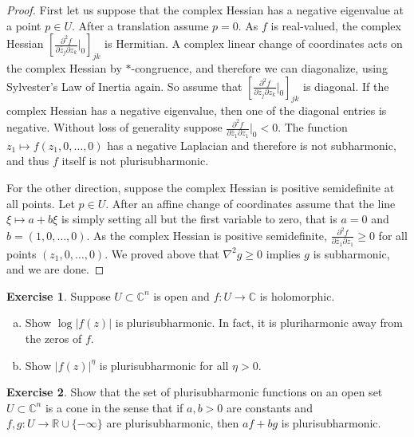 \documentclass[12pt,openany]{book}
\newcommand{\sabs}[1]{\lvert {#1} \rvert}
\newcommand{\C}{{\mathbb{C}}}
\newcommand{\R}{{\mathbb{R}}}
\theoremstyle{plain}
\theoremstyle{remark}
\theoremstyle{definition}
\newenvironment{exbox}{%
    \def\FrameCommand{\vrule width 1pt \relax\hspace {10pt}}%
    \MakeFramed {\advance \hsize -\width \FrameRestore }%
}{%
    \endMakeFramed
}
\newenvironment{exparts}{%
    \leavevmode\begin{enumerate}[a),noitemsep,topsep=0pt,parsep=0pt,partopsep=0pt]
}{%
    \end{enumerate}
}
\theoremstyle{exercise}
\newtheorem{exercise}{Exercise}[section]
\theoremstyle{example}
\begin{document}
\begin{proof}
First let us suppose that the complex Hessian has a negative eigenvalue at
a point $p \in U$.
After a translation assume $p=0$.
As $f$ is real-valued, the complex Hessian
$\left[
\frac{\partial^2 f}{\partial \bar{z}_j \partial z_k}
\Big|_0
\right]_{jk}$ is Hermitian.  A complex linear change of coordinates
acts on the complex Hessian by $*$-congruence, and therefore we can
diagonalize,
using Sylvester's Law of Inertia again.
So assume that 
$\left[
\frac{\partial^2 f}{\partial \bar{z}_j \partial z_k}
\Big|_0
\right]_{jk}$ is diagonal.  If the complex Hessian has a negative eigenvalue, then
one of the diagonal entries is negative.
Without loss of generality suppose
$\frac{\partial^2 f}{\partial \bar{z}_1 \partial z_1}\Big|_0 < 0$.
The function $z_1 \mapsto f(z_1,0,\ldots,0)$ has
a negative Laplacian and therefore is not subharmonic, and thus $f$ itself
is not plurisubharmonic.

For the other direction, suppose the complex Hessian is positive
semidefinite at all points.
Let $p \in U$.  After an affine change of coordinates assume that the
line $\xi \mapsto a+b\xi$ is simply setting all but the first variable to
zero, that is $a=0$ and $b=(1,0,\ldots,0)$.
As the complex Hessian is positive semidefinite,
$\frac{\partial^2 f}{\partial \bar{z}_1 \partial z_1} \geq 0$ for all
points $(z_1,0,\ldots,0)$.  We proved above that $\nabla^2 g \geq 0$
implies $g$ is subharmonic, and we are done.
\end{proof}

\begin{exbox}
\begin{exercise} \label{exercise:modholplush}
Suppose $U \subset \C^n$ is open and $f \colon U \to \C$ is holomorphic.
\begin{exparts}
\item
Show $\log \sabs{f(z)}$ is plurisubharmonic.  In fact, it is pluriharmonic away from the zeros of $f$.
\item
Show $\sabs{f(z)}^{\eta}$ is plurisubharmonic for all $\eta > 0$.
\end{exparts}
\end{exercise}

\begin{exercise}
Show that the set of plurisubharmonic functions on an open set $U \subset \C^n$
is a cone in the sense that if $a,b > 0$ are constants and
$f, g \colon U \to \R \cup \{ -\infty \}$ are plurisubharmonic, then
$a f + b g$ is plurisubharmonic.
\end{exercise}
\end{exbox}
\end{document}

